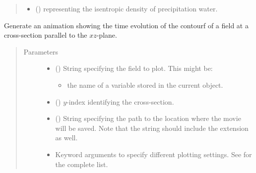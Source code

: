 \documentclass[letterpaper,10pt,english]{sphinxmanual}
\begin{document}
\begin{fulllineitems}
\begin{fulllineitems}
\begin{quote}
\begin{description}
\begin{itemize}
\item {} 
 () \textendash{}  representing the isentropic density of precipitation water.

\end{itemize}

\end{description}\end{quote}

\end{fulllineitems}


\begin{fulllineitems}
\label{\detokenize{api:storages.state_isentropic.StateIsentropic.animation_contourf_xz}}
Generate an animation showing the time evolution of the contourf of a field at a cross-section
parallel to the \(xz\)-plane.
\begin{quote}\begin{description}
\item[{Parameters}] \leavevmode\begin{itemize}
\item {} 
 () \textendash{} 
String specifying the field to plot. This might be:
\begin{itemize}
\item {} 
the name of a variable stored in the current object.

\end{itemize}


\item {} 
 () \textendash{} \(y\)-index identifying the cross-section.

\item {} 
 () \textendash{} String specifying the path to the location where the movie will be saved.
Note that the string should include the extension as well.

\item {} 
 \textendash{} Keyword arguments to specify different plotting settings.
See {\hyperref[\detokenize{api:tasmania.utils.utils_plot.animation_contourf_xz}]{}} for the complete list.


\end{itemize}
\end{description}
\end{quote}
\end{fulllineitems}
\end{fulllineitems}
\end{document}
